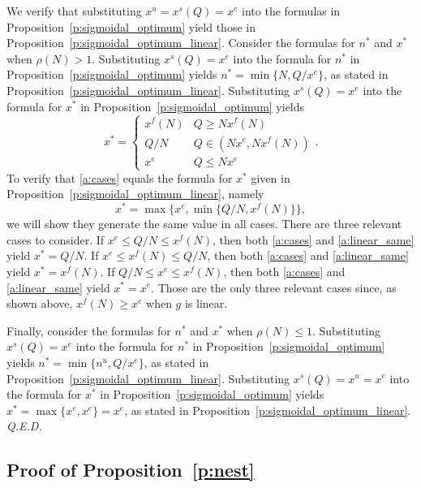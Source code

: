 \documentclass[12pt]{article}
\renewcommand{\qed}{{\it Q.E.D.}}
\newcommand{\general}{g}
\newcommand{\ratio}{\rho(N)}
\newcommand{\xfull}{x^{f\!}}
\newcommand{\xshort}{x^{s}}
\newcommand{\xunit}{x^{e}}
\newcommand{\xun}{x^{u}}
\newcommand{\nun}{n^{u}}
\begin{document}
We verify that substituting $\xun = \xshort(Q) = \xunit$ into the formulas in Proposition~\ref{p:sigmoidal_optimum} yield those in Proposition~\ref{p:sigmoidal_optimum_linear}. Consider the formulas for $n^*$ and $x^*$ when $\ratio > 1$. Substituting $\xshort(Q) = \xunit$ into the formula for $n^*$ in Proposition~\ref{p:sigmoidal_optimum} yields $n^* = \min \{ N, Q / \xunit \}$, as stated in Proposition~\ref{p:sigmoidal_optimum_linear}. Substituting $\xshort(Q) = \xunit$ into the formula for $x^*$ in  Proposition~\ref{p:sigmoidal_optimum} yields
\begin{equation}
\label{a:cases}
x^* = \begin{cases}
\xfull(N) & Q \geq N \xfull(N) \\
Q/N & Q \in \left( N \xunit, N \xfull(N) \right) \\ 
\xunit & Q \leq N\xunit
\end{cases}. 
\end{equation}
To verify that \eqref{a:cases} equals the formula for $x^*$ given in Proposition~\ref{p:sigmoidal_optimum_linear}, namely
\begin{equation}
\label{a:linear_same}
x^*  = \max \{ \xunit, \min \{ Q/N, \xfull(N) \} \},
\end{equation}
we will show they generate the same value in all cases. There are three relevant cases to consider. If $\xunit \leq Q/N \leq \xfull(N)$, then both \eqref{a:cases} and \eqref{a:linear_same} yield  $x^* = Q/N$. If $\xunit \leq \xfull(N) \leq Q/N$, then both \eqref{a:cases} and \eqref{a:linear_same} yield  $x^* = \xfull(N)$. If $Q/N \leq \xunit \leq  \xfull(N)$, then both \eqref{a:cases} and \eqref{a:linear_same} yield  $x^* = \xunit$. Those are the only three relevant cases since, as shown above, $\xfull(N) \geq \xunit$ when $\general$ is linear. 

Finally, consider the formulas for $n^*$ and $x^*$ when $\ratio \leq 1$. 
Substituting $\xshort(Q) = \xunit$ into the formula for $n^*$ in Proposition~\ref{p:sigmoidal_optimum} yields $n^* = \min \{ \nun, Q / \xunit \}$, as stated in Proposition~\ref{p:sigmoidal_optimum_linear}. Substituting $\xshort(Q) = \xun = \xunit$ into the formula for $x^*$ in Proposition~\ref{p:sigmoidal_optimum} yields $x^* = \max \{ \xunit, \xunit \} = \xunit$, as stated in Proposition~\ref{p:sigmoidal_optimum_linear}. \qed


\subsection*{Proof of Proposition~\ref{p:nest}}
\end{document}
